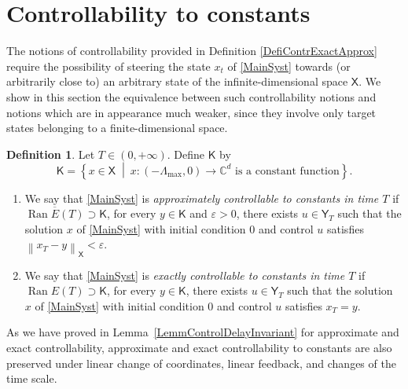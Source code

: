 \documentclass[JEP,XML,SOM,Unicode]{cedram}
\theoremstyle{plain}
\theoremstyle{definition}
\newtheorem{defi}[theo]{Definition}
\DeclareMathOperator{\range}{Ran}
\newcommand{\midsuchthat}{\;\middle|\:}
\newcommand{\norm}[1]{\left\lVert #1\right\lVert}
\begin{document}
\section{Controllability to constants}
\label{SecContrConst}

The notions of controllability provided in Definition \ref{DefiContrExactApprox} require the possibility of steering the state $x_t$ of \eqref{MainSyst} towards (or arbitrarily close to) an arbitrary state of the infinite-dimensional space $\mathsf X$. We show in this section the equivalence between such controllability notions and notions which are in appearance much weaker, since they involve only target states belonging to a finite-dimensional space.

\begin{defi}
\label{DefiControlToCst}
Let $T \in (0, +\infty)$.
Define $\mathsf K$ by
\begin{equation}
\label{DefMathsfK}
\mathsf K = \left\{x \in \mathsf X \midsuchthat x: (-\Lambda_{\max}, 0) \rightarrow \mathbb C^d \text{ is a constant function}\right\}.
\end{equation}

\begin{enumerate}
\item We say that \eqref{MainSyst} is \emph{approximately controllable to constants in time $T$} if $\overline{\range E(T)} \supset \mathsf K$, \ie for every $y \in \mathsf K$ and $\varepsilon > 0$, there exists $u \in \mathsf Y_T$ such that the solution $x$ of \eqref{MainSyst} with initial condition $0$ and control $u$ satisfies $\norm{x_T - y}_{\mathsf X} < \varepsilon$.

\item We say that \eqref{MainSyst} is \emph{exactly controllable to constants in time $T$} if $\range E(T) \supset \mathsf K$, \ie for every $y \in \mathsf K$, there exists $u \in \mathsf Y_T$ such that the solution $x$ of \eqref{MainSyst} with initial condition $0$ and control $u$ satisfies $x_T = y$.
\end{enumerate}
\end{defi}

As we have proved in Lemma~\ref{LemmControlDelayInvariant} for approximate and exact controllability, approx\-imate and exact controllability to constants are also preserved under linear change of coordinates, linear feedback, and changes of the time scale.
\end{document}
